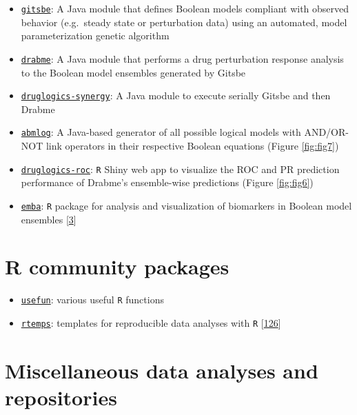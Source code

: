 \documentclass[
  12pt,
]{book}
\providecommand{\tightlist}{%
  \setlength{\itemsep}{0pt}\setlength{\parskip}{0pt}}
\begin{document}
\begin{itemize}
\tightlist
\item
  \href{https://github.com/druglogics/gitsbe}{\texttt{gitsbe}}: A Java module that defines Boolean models compliant with observed behavior (e.g.~steady state or perturbation data) using an automated, model parameterization genetic algorithm
\item
  \href{https://github.com/druglogics/drabme}{\texttt{drabme}}: A Java module that performs a drug perturbation response analysis to the Boolean model ensembles generated by Gitsbe
\item
  \href{https://github.com/druglogics/druglogics-synergy}{\texttt{druglogics-synergy}}: A Java module to execute serially Gitsbe and then Drabme
\item
  \href{https://github.com/druglogics/abmlog}{\texttt{abmlog}}: A Java-based generator of all possible logical models with AND/OR-NOT link operators in their respective Boolean equations (Figure \ref{fig:fig7})
\item
  \href{https://github.com/druglogics/druglogics-roc}{\texttt{druglogics-roc}}: \texttt{R} Shiny web app to visualize the ROC and PR prediction performance of Drabme's ensemble-wise predictions (Figure \ref{fig:fig6})
\item
  \href{https://github.com/bblodfon/emba/}{\texttt{emba}}: \texttt{R} package for analysis and visualization of biomarkers in Boolean model ensembles {[}\protect\hyperlink{ref-Zobolas2020}{3}{]}
\end{itemize}

\hypertarget{r-community-packages}{%
\section*{R community packages}\label{r-community-packages}}

\begin{itemize}
\tightlist
\item
  \href{https://github.com/bblodfon/usefun}{\texttt{usefun}}: various useful \texttt{R} functions
\item
  \href{https://github.com/bblodfon/rtemps}{\texttt{rtemps}}: templates for reproducible data analyses with \texttt{R} {[}\protect\hyperlink{ref-rtemps}{126}{]}
\end{itemize}

\hypertarget{misc-links}{%
\section*{Miscellaneous data analyses and repositories}\label{misc-links}}
\end{document}
